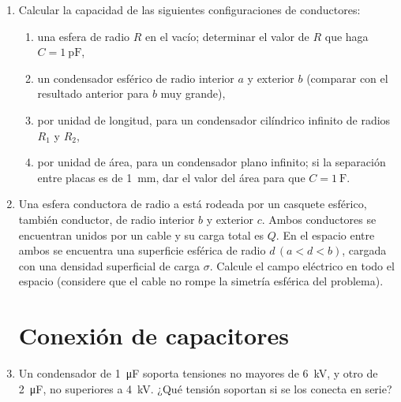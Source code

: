 \documentclass[11pt,spanish,a4paper]{article}
\begin{document}
\begin{enumerate}
  \item Calcular la capacidad de las siguientes configuraciones de conductores:
\begin{enumerate}
  \item una esfera de radio \(R\) en el vacío; determinar el valor de \(R\) que haga \(C= \SI{1}{\pico\farad}\), 
  \item un condensador esférico de radio interior \(a\) y exterior \(b\) (comparar con el resultado anterior para \(b\) muy grande), 
  \item por unidad de longitud, para un condensador cilíndrico infinito de radios \(R_1\) y \(R_2\),
  \item por unidad de área, para un condensador plano infinito; si la separación entre placas es de \SI{1}{\milli\metre}, dar el valor del área para que \(C =\SI{1}{\farad}\).
\end{enumerate}


\item Una esfera conductora de radio a está rodeada por un casquete esférico, también conductor, de radio interior \(b\) y exterior \(c\).
Ambos conductores se encuentran unidos por un cable y su carga total es \(Q\).
En el espacio entre ambos se encuentra una superficie esférica de radio \(d\, (a < d < b)\),
cargada con una densidad superficial de carga \(\sigma\).
Calcule el campo eléctrico en todo el espacio (considere que el cable no rompe la simetría esférica del problema). 


\section*{Conexión de capacitores}

\item Un condensador de \SI{1}{\micro\farad} soporta tensiones no mayores de \SI{6}{\kilo\volt}, y otro de \SI{2}{\micro\farad}, no superiores a
\SI{4}{\kilo\volt}.
¿Qué tensión soportan si se los conecta en serie?



\end{enumerate}
\end{document}
